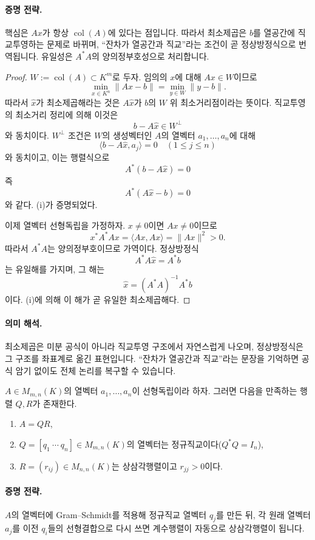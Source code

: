 \paragraph{증명 전략.}
핵심은 $Ax$가 항상 $\operatorname{col}(A)$에 있다는 점입니다. 따라서 최소제곱은 $b$를 열공간에 직교투영하는 문제로 바뀌며, ``잔차가 열공간과 직교''라는 조건이 곧 정상방정식으로 번역됩니다. 유일성은 $A^*A$의 양의정부호성으로 처리합니다.

\begin{proof}
$W:=\operatorname{col}(A)\subset K^m$로 두자. 임의의 $x$에 대해 $Ax\in W$이므로
$$
\min_{x\in K^n}\|Ax-b\|
=\min_{y\in W}\|y-b\|.
$$
따라서 $\hat x$가 최소제곱해라는 것은 $A\hat x$가 $b$의 $W$ 위 최소거리점이라는 뜻이다. 직교투영의 최소거리 정리에 의해 이것은
$$
b-A\hat x\in W^\perp
$$
와 동치이다. $W^\perp$ 조건은 $W$의 생성벡터인 $A$의 열벡터 $a_1,\dots,a_n$에 대해
$$
\langle b-A\hat x,a_j\rangle=0\quad(1\le j\le n)
$$
와 동치이고, 이는 행렬식으로
$$
A^*(b-A\hat x)=0
$$
즉
$$
A^*(A\hat x-b)=0
$$
와 같다. (i)가 증명되었다.

이제 열벡터 선형독립을 가정하자. $x\ne0$이면 $Ax\ne0$이므로
$$
x^*A^*Ax=\langle Ax,Ax\rangle=\|Ax\|^2>0.
$$
따라서 $A^*A$는 양의정부호이므로 가역이다. 정상방정식
$$
A^*A\hat x=A^*b
$$
는 유일해를 가지며, 그 해는
$$
\hat x=(A^*A)^{-1}A^*b
$$
이다. (i)에 의해 이 해가 곧 유일한 최소제곱해다.
\end{proof}

\paragraph{의미 해석.}
최소제곱은 미분 공식이 아니라 직교투영 구조에서 자연스럽게 나오며, 정상방정식은 그 구조를 좌표계로 옮긴 표현입니다. ``잔차가 열공간과 직교''라는 문장을 기억하면 공식 암기 없이도 전체 논리를 복구할 수 있습니다.

\begin{theorem}[QR 분해의 존재]
$A\in M_{m,n}(K)$의 열벡터 $a_1,\dots,a_n$이 선형독립이라 하자. 그러면 다음을 만족하는 행렬 $Q,R$가 존재한다.
\begin{enumerate}[label=(\roman*)]
\item $A=QR$,
\item $Q=[q_1\ \cdots\ q_n]\in M_{m,n}(K)$의 열벡터는 정규직교이다($Q^*Q=I_n$),
\item $R=(r_{ij})\in M_{n,n}(K)$는 상삼각행렬이고 $r_{jj}>0$이다.
\end{enumerate}
\end{theorem}

\paragraph{증명 전략.}
$A$의 열벡터에 Gram--Schmidt를 적용해 정규직교 열벡터 $q_j$를 만든 뒤, 각 원래 열벡터 $a_j$를 이전 $q_i$들의 선형결합으로 다시 쓰면 계수행렬이 자동으로 상삼각행렬이 됩니다.

